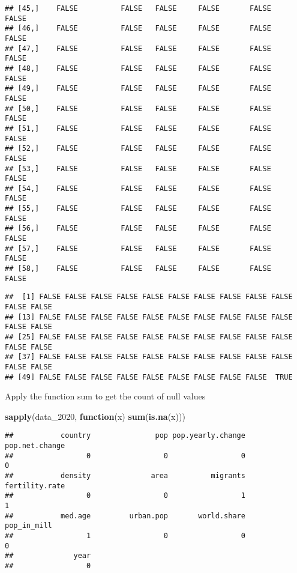 \documentclass[
]{article}
\newenvironment{Shaded}{\begin{snugshade}}{\end{snugshade}}
\newcommand{\ControlFlowTok}[1]{\textcolor[rgb]{0.13,0.29,0.53}{\textbf{#1}}}
\newcommand{\FunctionTok}[1]{\textcolor[rgb]{0.13,0.29,0.53}{\textbf{#1}}}
\newcommand{\NormalTok}[1]{#1}
\newcommand{\SpecialCharTok}[1]{\textcolor[rgb]{0.81,0.36,0.00}{\textbf{#1}}}
\begin{document}
\begin{verbatim}
## [45,]    FALSE          FALSE   FALSE     FALSE       FALSE       FALSE
## [46,]    FALSE          FALSE   FALSE     FALSE       FALSE       FALSE
## [47,]    FALSE          FALSE   FALSE     FALSE       FALSE       FALSE
## [48,]    FALSE          FALSE   FALSE     FALSE       FALSE       FALSE
## [49,]    FALSE          FALSE   FALSE     FALSE       FALSE       FALSE
## [50,]    FALSE          FALSE   FALSE     FALSE       FALSE       FALSE
## [51,]    FALSE          FALSE   FALSE     FALSE       FALSE       FALSE
## [52,]    FALSE          FALSE   FALSE     FALSE       FALSE       FALSE
## [53,]    FALSE          FALSE   FALSE     FALSE       FALSE       FALSE
## [54,]    FALSE          FALSE   FALSE     FALSE       FALSE       FALSE
## [55,]    FALSE          FALSE   FALSE     FALSE       FALSE       FALSE
## [56,]    FALSE          FALSE   FALSE     FALSE       FALSE       FALSE
## [57,]    FALSE          FALSE   FALSE     FALSE       FALSE       FALSE
## [58,]    FALSE          FALSE   FALSE     FALSE       FALSE       FALSE
\end{verbatim}

\begin{Shaded}
\end{Shaded}

\begin{verbatim}
##  [1] FALSE FALSE FALSE FALSE FALSE FALSE FALSE FALSE FALSE FALSE FALSE FALSE
## [13] FALSE FALSE FALSE FALSE FALSE FALSE FALSE FALSE FALSE FALSE FALSE FALSE
## [25] FALSE FALSE FALSE FALSE FALSE FALSE FALSE FALSE FALSE FALSE FALSE FALSE
## [37] FALSE FALSE FALSE FALSE FALSE FALSE FALSE FALSE FALSE FALSE FALSE FALSE
## [49] FALSE FALSE FALSE FALSE FALSE FALSE FALSE FALSE FALSE  TRUE
\end{verbatim}

Apply the function sum to get the count of null values

\begin{Shaded}
\begin{Highlighting}[]
\FunctionTok{sapply}\NormalTok{(data\_2020, }\ControlFlowTok{function}\NormalTok{(x) }\FunctionTok{sum}\NormalTok{(}\FunctionTok{is.na}\NormalTok{(x)))}
\end{Highlighting}
\end{Shaded}

\begin{verbatim}
##           country               pop pop.yearly.change    pop.net.change 
##                 0                 0                 0                 0 
##           density              area          migrants    fertility.rate 
##                 0                 0                 1                 1 
##           med.age         urban.pop       world.share       pop_in_mill 
##                 1                 0                 0                 0 
##              year 
##                 0
\end{verbatim}
\end{document}

